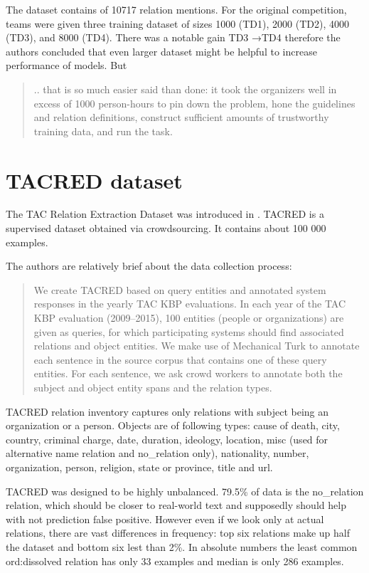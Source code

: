 The dataset contains of 10717 relation mentions. For the original competition, teams were given three training dataset of sizes 1000 (TD1), 2000 (TD2), 4000 (TD3), and 8000 (TD4). There was a notable gain TD3 →TD4 therefore the authors concluded that even larger dataset might be helpful to increase performance of models. But 

\begin{quotation}.. that is so much easier said than done: it took the organizers well in excess of 1000 person-hours to pin down the problem, hone the guidelines and
relation definitions, construct sufficient amounts of trustworthy training data, and run the task.
\end{quotation}




\section{TACRED dataset}
The TAC Relation Extraction Dataset was introduced in \cite{zhang2017tacred}. TACRED is a supervised dataset obtained via crowdsourcing. It contains about 100 000 examples. 

The authors are relatively brief about the data collection process:

\begin{quote}
We create TACRED based on query entities and annotated system responses in the yearly TAC KBP evaluations. In each year of the TAC KBP evaluation (2009–2015), 100 entities (people or organizations) are given as queries, for which participating systems should find associated relations and object entities. We make use of Mechanical Turk to annotate each sentence in the source corpus that contains one of these query entities. For each sentence, we ask crowd workers to annotate both the subject and object entity spans and the relation types.
\end{quote}

TACRED relation inventory captures only relations with subject being an organization or a person. Objects are of following types: cause of death, city, country, criminal charge, date, duration, ideology, location, misc (used for alternative name relation and no\_relation only), nationality, number, organization, person, religion, state or province, title and url.


TACRED was designed to be highly unbalanced. 79.5\% of data is the no\_relation relation, which should be closer to real-world text and supposedly should help with not prediction false positive. However even if we look only at actual relations, there are vast differences in frequency: top six relations make up half the dataset and bottom six lest than 2\%. In absolute numbers the least common ord:dissolved relation has only 33 examples and median is only 286 examples.
 


